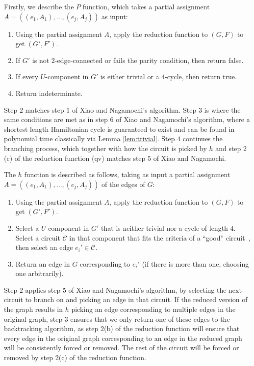 \sloppy Firstly, we describe the $P$ function, which takes a partial assignment $A = ((e_1, A_1),\dots,(e_j, A_j))$ as input:

\begin{enumerate}
\item Using the partial assignment $A$, apply the reduction function to $(G, F)$ to get $(G', F')$.
\item If $G'$ is not $2$-edge-connected or fails the parity condition, then return false.
\item If every $U$-component in $G'$ is either trivial or a $4$-cycle, then return true.
\item Return indeterminate.
\end{enumerate}

Step $2$ matches step $1$ of Xiao and Nagamochi's algorithm. Step $3$ is where the same conditions are met as in step $6$ of Xiao and Nagamochi's algorithm, where a shortest length Hamiltonian cycle is guaranteed to exist and can be found in polynomial time classically via Lemma \ref{lem:trivial}. Step $4$ continues the branching process, which together with how the circuit is picked by $h$ and step $2$(c) of the reduction function (qv) matches step $5$ of Xiao and Nagamochi.

\sloppy The $h$ function is described as follows, taking as input a partial assignment $A = ((e_1, A_1),\dots,(e_j, A_j))$ of the edges of $G$:

\begin{enumerate}
\item Using the partial assignment $A$, apply the reduction function to $(G, F)$ to get $(G', F')$.
\item Select a $U$-component in $G'$ that is neither trivial nor a cycle of length $4$. Select a circuit $\mathcal{C}$ in that component that fits the criteria of a ``good'' circuit~\cite{xiao2016degree3}, then select an edge $e_i' \in \mathcal{C}$.
\item Return an edge in $G$ corresponding to $e_i'$ (if there is more than one, choosing one arbitrarily).
\end{enumerate}

Step $2$ applies step $5$ of Xiao and Nagamochi's algorithm, by selecting the next circuit to branch on and picking an edge in that circuit. If the reduced version of the graph results in $h$ picking an edge corresponding to multiple edges in the original graph, step $3$ ensures that we only return one of these edges to the backtracking algorithm, as step $2$(b) of the reduction function will ensure that every edge in the original graph corresponding to an edge in the reduced graph will be consistently forced or removed. The rest of the circuit will be forced or removed by step $2$(c) of the reduction function.

